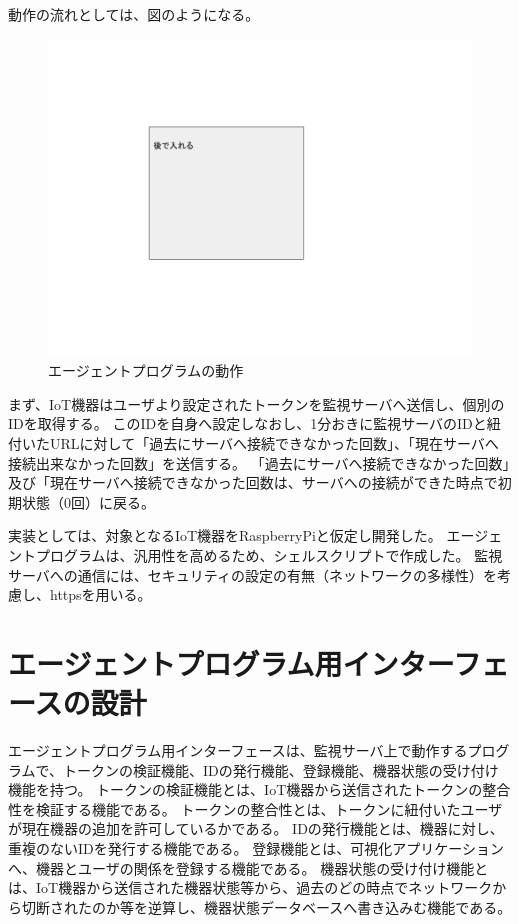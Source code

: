 動作の流れとしては、図のようになる。
\begin{figure}[htbp]
\includegraphics[width=16cm]{images/test.png}
\caption{エージェントプログラムの動作}
\label{fig:agent_flow}
\end{figure}
まず、IoT機器はユーザより設定されたトークンを監視サーバへ送信し、個別のIDを取得する。
このIDを自身へ設定しなおし、1分おきに監視サーバのIDと紐付いたURLに対して「過去にサーバへ接続できなかった回数」、「現在サーバへ接続出来なかった回数」を送信する。
「過去にサーバへ接続できなかった回数」及び「現在サーバへ接続できなかった回数は、サーバへの接続ができた時点で初期状態（0回）に戻る。

実装としては、対象となるIoT機器をRaspberryPiと仮定し開発した。
エージェントプログラムは、汎用性を高めるため、シェルスクリプトで作成した。
監視サーバへの通信には、セキュリティの設定の有無（ネットワークの多様性）を考慮し、httpsを用いる。

\section{エージェントプログラム用インターフェースの設計}
エージェントプログラム用インターフェースは、監視サーバ上で動作するプログラムで、トークンの検証機能、IDの発行機能、登録機能、機器状態の受け付け機能を持つ。
トークンの検証機能とは、IoT機器から送信されたトークンの整合性を検証する機能である。
トークンの整合性とは、トークンに紐付いたユーザが現在機器の追加を許可しているかである。
IDの発行機能とは、機器に対し、重複のないIDを発行する機能である。
登録機能とは、可視化アプリケーションへ、機器とユーザの関係を登録する機能である。
機器状態の受け付け機能とは、IoT機器から送信された機器状態等から、過去のどの時点でネットワークから切断されたのか等を逆算し、機器状態データベースへ書き込みむ機能である。


